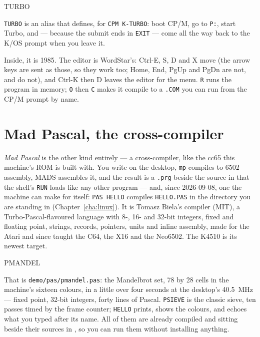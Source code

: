 \begin{type}
TURBO
\end{type}

\noindent \verb|TURBO| is an alias that 
defines, for \verb|CPM K-TURBO|: boot CP/M, go to \verb|P:|, start Turbo,
and --- because the submit ends in \verb|EXIT| --- come all the way back
to the K/OS prompt when you leave it.


Inside, it is 1985. The editor is WordStar's: Ctrl-E, S, D and X move
(the arrow keys are sent as those, so they work too; Home, End, PgUp and
PgDn are not, and do not), and Ctrl-K then D leaves the editor for the
menu. \verb|R| runs the program in memory;
\verb|O| then \verb|C| makes it compile to a \texttt{.COM} you can run
from the CP/M prompt by name.

\section{Mad Pascal, the cross-compiler}
\emph{Mad Pascal} is the other kind entirely --- a cross-compiler, like
the cc65 this machine's ROM is built with. You write on the desktop,
\texttt{mp} compiles to 6502 assembly, MADS assembles it, and the result
is a \texttt{.prg} beside the source in  that the
shell's \verb|RUN| loads like any other program --- and, since 2026-09-08,
one the machine can make for itself: \verb|PAS HELLO| compiles
\texttt{HELLO.PAS} in the directory you are standing in
(Chapter~\ref{cha:linux}). It is Tomasz Biela's compiler (MIT), a
Turbo-Pascal-flavoured language with 8-, 16- and 32-bit integers, fixed
and floating point, strings, records, pointers, units and inline
assembly, made for the Atari and since taught the C64, the X16 and the
Neo6502. The K4510 is its newest target.

\begin{type}
PMANDEL
\end{type}


That is \texttt{demo/pas/pmandel.pas}: the Mandelbrot set, 78 by 28
cells in the machine's sixteen colours, in a little over four seconds
at the desktop's 40.5~MHz --- fixed point, 32-bit integers, forty lines
of Pascal.
\verb|PSIEVE| is the classic sieve, ten passes timed by the frame
counter; \verb|HELLO| prints, shows the colours, and echoes what you
typed after its name. All of them are already compiled and sitting
beside their sources in , so you can run them without
installing anything.


